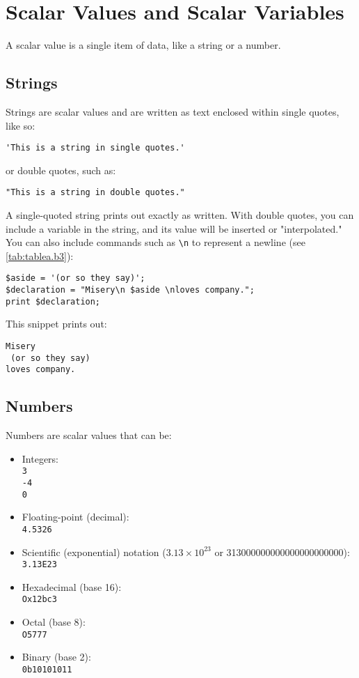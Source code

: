 \section{Scalar Values and Scalar Variables}
A scalar value is a single item of data, like a string or a number.

\subsection{Strings}
Strings are scalar values and are written as text enclosed within single quotes, like so:

\begin{lstlisting}
'This is a string in single quotes.'
\end{lstlisting}

or double quotes, such as:

\begin{lstlisting}
"This is a string in double quotes."
\end{lstlisting}

A single-quoted string prints out exactly as written. With double quotes, you can include a variable in the string, and its value will be inserted or "interpolated." You can also include commands such as \verb|\n| to represent a newline (see \autoref{tab:tablea.b3}):

\begin{lstlisting}
$aside = '(or so they say)';
$declaration = "Misery\n $aside \nloves company.";
print $declaration;
\end{lstlisting}

This snippet prints out:

\begin{lstlisting}
Misery 
 (or so they say) 
loves company.
\end{lstlisting}

\subsection{Numbers}
Numbers are scalar values that can be:

\begin{itemize}
  \item Integers:\\ \verb|3|\\ \verb|-4|\\ \verb|0|
  \item Floating-point (decimal):\\ \verb|4.5326|
  \item Scientific (exponential) notation ($3.13 \times 10^{23}$ or 313000000000000000000000):\\ \verb|3.13E23|
  \item Hexadecimal (base 16):\\ \verb|Ox12bc3|
  \item Octal (base 8):\\ \verb|O5777|
  \item Binary (base 2):\\ \verb|0b10101011|
\end{itemize}

